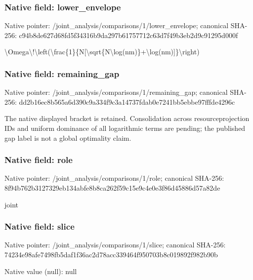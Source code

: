 \documentclass[10pt,a4paper]{article}
\begin{document}
\subsubsection{Native field: lower\_envelope}


Native pointer: /joint\_analysis/comparis\allowbreak{}ons/1/lower\_envelope; canonical SHA-256: c94b8de627d68fd5f34316b9\allowbreak{}da297b61757712c63d7f49b3\allowbreak{}eb2d9c91295d000f


\textbackslash{}Omega\textbackslash{}!\textbackslash{}left(\textbackslash{}frac\{1\}\{N\allowbreak{}[\textbackslash{}sqrt\{N\textbackslash{}log(nm)\}+\textbackslash{}log(n\allowbreak{}m)]\}\textbackslash{}right)


\subsubsection{Native field: remaining\_gap}


Native pointer: /joint\_analysis/comparis\allowbreak{}ons/1/remaining\_gap; canonical SHA-256: dd2b16ec8b565a6d390c9a33\allowbreak{}4f9c3a14737fdab0e7241bb5\allowbreak{}ebbe97fffde4296c


The native displayed bracket is retained. Consolidation across resourceprojection IDs and uniform dominance of all logarithmic terms are pending; the published gap label is not a global optimality claim.


\subsubsection{Native field: role}


Native pointer: /joint\_analysis/comparisons/1/role; canonical SHA-256: 8f94b762b3127329eb134abf\allowbreak{}e8b8ca262f59c15e9c4e0e3f\allowbreak{}86d45886d57a82de


joint


\subsubsection{Native field: slice}


Native pointer: /joint\_analysis/comparisons/1/slice; canonical SHA-256: 74234e98afe7498fb5daf1f3\allowbreak{}6ac2d78acc339464f950703b\allowbreak{}8c019892f982b90b



Native value (null): null
\end{document}
